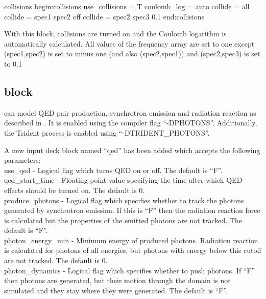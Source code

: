 \begin{lboxverbatim}{collisions}
begin:collisions
   use_collisions = T
   coulomb_log = auto
   collide = all
   collide = spec1 spec2 off
   collide = spec2 spec3 0.1
end:collisions
\end{lboxverbatim}

  With this block, collisions are turned on and the Coulomb logarithm is
  automatically calculated. All values of the frequency array are set
  to one except (spec1,spec2) is set to minus one (and also (spec2,spec1))
  and (spec2,spec3) is set to 0.1


\subsection{ block}
\label{sec:qed_block}

{\EPOCH} can model QED pair production, synchrotron emission and
radiation reaction as described in \citet{Duclous}.
It is enabled using the compiler flag ``-DPHOTONS''. Additionally,
the Trident process is enabled using ``-DTRIDENT\_PHOTONS''.

A new input deck block named ``qed'' has been added which accepts the
following parameters:\\

{\emphtext use\_qed} - Logical flag which turns QED on or off. The default
  is ``F''.\\

{\emphtext qed\_start\_time} - Floating point value specifying the time after
  which QED effects should be turned on. The default is 0.\\

{\emphtext produce\_photons} - Logical flag which specifies whether to track
  the photons generated by synchrotron emission. If this is ``F'' then the
  radiation reaction force is calculated but the properties of the emitted
  photons are not tracked. The default is ``F''.\\

{\emphtext photon\_energy\_min} - Minimum energy of produced photons.
  Radiation reaction is calculated for photons of all energies, but photons
  with energy below this cutoff are not tracked.  The default is 0.\\

{\emphtext photon\_dynamics} - Logical flag which specifies whether to push
  photons.  If ``F'' then photons are generated, but their motion through the
  domain is not simulated and they stay where they were generated. The default
  is ``F''.\\

